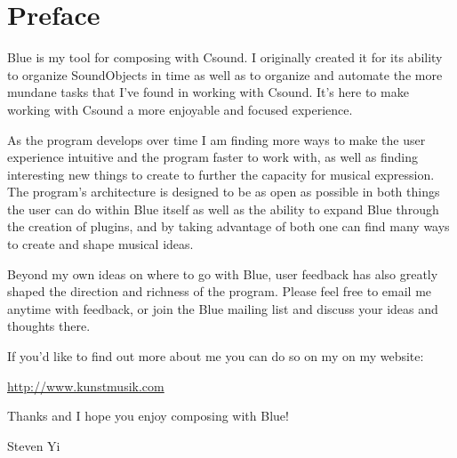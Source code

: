 \chapter*{Preface}
\label{preface}

Blue is my tool for composing with Csound. I originally created it for
its ability to organize SoundObjects in time as well as to organize and
automate the more mundane tasks that I've found in working with Csound.
It's here to make working with Csound a more enjoyable and focused
experience.

As the program develops over time I am finding more ways to make the
user experience intuitive and the program faster to work with, as well
as finding interesting new things to create to further the capacity for
musical expression. The program's architecture is designed to be as open
as possible in both things the user can do within Blue itself as well as
the ability to expand Blue through the creation of plugins, and by
taking advantage of both one can find many ways to create and shape
musical ideas.

Beyond my own ideas on where to go with Blue, user feedback has also
greatly shaped the direction and richness of the program. Please feel
free to email me anytime with feedback, or join the Blue mailing list
and discuss your ideas and thoughts there.

If you'd like to find out more about me you can do so on my on my
website:

\url{http://www.kunstmusik.com}

Thanks and I hope you enjoy composing with Blue!

Steven Yi
